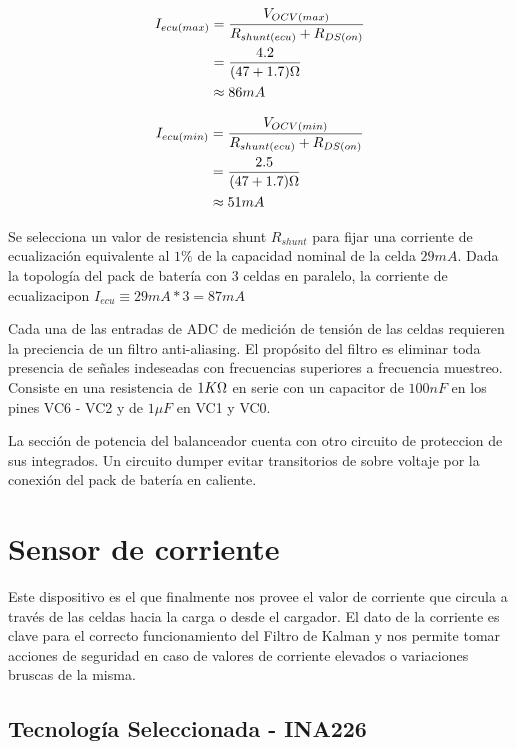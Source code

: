 \documentclass[10pt, a4paper]{report}
\begin{document}
\begin{align}
    I_{ecu (max)} &= \frac{V_{OCV(max)}}{R_{shunt(ecu)}+R_{DS (on)}}\\
    &= \frac{4.2}{(47 + 1.7)\ohm}\\
    &\approx 86mA
\end{align}

\begin{align}
    I_{ecu (min)} &= \frac{V_{OCV(min)}}{R_{shunt(ecu)}+R_{DS (on)}}\\
    &= \frac{2.5}{(47 + 1.7)\ohm}\\
    &\approx 51mA
\end{align}

Se selecciona un valor de resistencia shunt $R_{shunt}$ para fijar una corriente
de ecualización equivalente al $1\%$ de la capacidad nominal de la celda $29mA$. 
Dada la topología del pack de batería con 3 celdas en paralelo, la corriente de
ecualizacipon $I_{ecu} \equiv 29mA * 3 = 87 mA$

Cada una de las entradas de ADC de medición de tensión de las celdas requieren
la preciencia de un filtro anti-aliasing. El propósito del filtro es eliminar
toda presencia de señales indeseadas con frecuencias superiores a frecuencia
muestreo. Consiste en una resistencia de $1 K\ohm$ en serie con un capacitor de
$100 nF$ en los pines VC6 - VC2 y de $1 \mu F$ en VC1 y VC0.

La sección de potencia del balanceador cuenta con otro circuito de proteccion de
sus integrados. Un circuito dumper evitar transitorios de sobre voltaje por la
conexión del pack de batería en caliente. 

\newpage

\section{Sensor de corriente}

Este dispositivo es el que finalmente nos provee el valor de corriente que 
circula a través de las celdas hacia la carga o desde el cargador. El dato de la 
corriente es clave para el correcto funcionamiento del Filtro de Kalman y nos 
permite tomar acciones de seguridad en caso de valores de corriente elevados o 
variaciones bruscas de la misma.

\subsection{Tecnología Seleccionada - INA226}\label{seq:ina226_selection}
\end{document}
